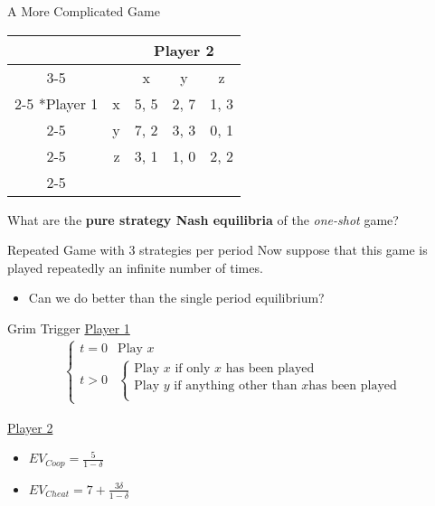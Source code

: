
\begin{frame}{A More Complicated Game}
  \begin{center}
  \begin{tabular}{cr|c|c|c|}
  	& \multicolumn{1}{c}{} & \multicolumn{3}{c}{Player 2}\\ \cline{3-5}
    \multicolumn{1}{c}{} & \multicolumn{1}{c}{} & x & y & z \\\cline{2-5}
    \multirow{3}*{Player 1}  & x & 5, 5 & 2, 7 & 1, 3 \\\cline{2-5}
                             & y & 7, 2 & 3, 3 & 0, 1 \\\cline{2-5}
                             & z & 3, 1 & 1, 0 & 2, 2 \\\cline{2-5}
  \end{tabular}
  \end{center}

  What are the \textbf{pure strategy Nash equilibria} of the \textit{one-shot} game?
\end{frame}

\begin{frame}{Repeated Game with 3 strategies per period}
  Now suppose that this game is played repeatedly an infinite number of times.  
  \begin{itemize}
    \item Can we do better than the single period equilibrium? 
  \end{itemize}
\end{frame}

\begin{frame}{Grim Trigger}
  \underline{Player 1} 
  \begin{align*}
    \begin{cases}
      t = 0 & \text{Play } x  \\ 
      t > 0 & 
      \begin{cases}
        \text{Play } x \text{ if only } x \text{ has been played } \\
        \text{Play } y \text{ if anything other than } x \text{has been played} \\
      \end{cases}
    \end{cases} 
  \end{align*}

  \underline{Player 2}
  \begin{itemize}
    \item $EV_{Coop} = \frac{5}{1-\delta}$ 
    \item $EV_{Cheat} = 7 + \frac{3\delta}{1-\delta}$
  \end{itemize}
\end{frame}


